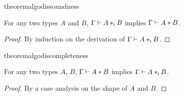 \begin{restatable}{theorem}{algodissoundness}
  \label{theorem:soundness}

  For any two types $A$ and $B$, $\Gamma \vdash A *_\textnormal{i} B$ implies $\Gamma \vdash A * B$.
\end{restatable}

\begin{proof}
  By induction on the derivation of $\Gamma \vdash A *_\textnormal{i} B$.
\end{proof}

\begin{restatable}{theorem}{algodiscompleteness}
  \label{theorem:completeness}

  For any two types $A$, $B$, $\Gamma \vdash A * B$ implies $\Gamma \vdash A *_\textnormal{i} B$.
\end{restatable}

\begin{proof}
  By a case analysis on the shape of $A$ and $B$.
\end{proof}
